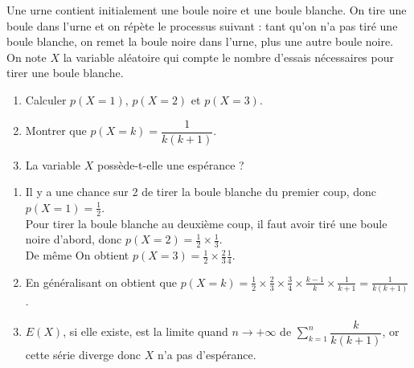 \documentclass[a4paper, 12pt]{colle}
\begin{document}
\maketitle
\exo
Une urne contient initialement une boule noire et une boule blanche. On tire une boule dans l'urne et on répète le processus suivant : tant qu'on n'a pas tiré une boule blanche, on remet la boule noire dans l'urne, plus une autre boule noire. On note $X$ la variable aléatoire qui compte le nombre d'essais nécessaires pour tirer une boule blanche.
\begin{enumerate}
	\item Calculer $p(X=1)$, $p(X=2)$ et $p(X=3)$.
	\item Montrer que $p(X=k)=\dfrac{1}{k(k+1)}$.
	\item La variable $X$ possède-t-elle une espérance ?
\end{enumerate}
\corr
\begin{enumerate}
	\item Il y a une chance sur 2 de tirer la boule blanche du premier coup, donc $p(X=1)=\frac{1}{2}$.\\
	      Pour tirer la boule blanche au deuxième coup, il faut avoir tiré une boule noire d'abord, donc $p(X=2)=\frac{1}{2}\times\frac{1}{3}$.\\
	      De même On obtient $p(X=3)=\frac{1}{2}\times\frac{2}{3}\frac{1}{4}$.
	\item En généralisant on obtient que $p(X=k)=\frac{1}{2}\times\frac{2}{3}\times\frac{3}{4}\times\frac{k-1}{k}\times\frac{1}{k+1}=\frac{1}{k(k+1)}$.
	\item $E(X)$, si elle existe, est la limite quand $n\to+\infty$ de $\sum_{k=1}^{n}\dfrac{k}{k(k+1)}$, or cette série diverge donc $X$ n'a pas d'espérance.
\end{enumerate}
\end{document}
